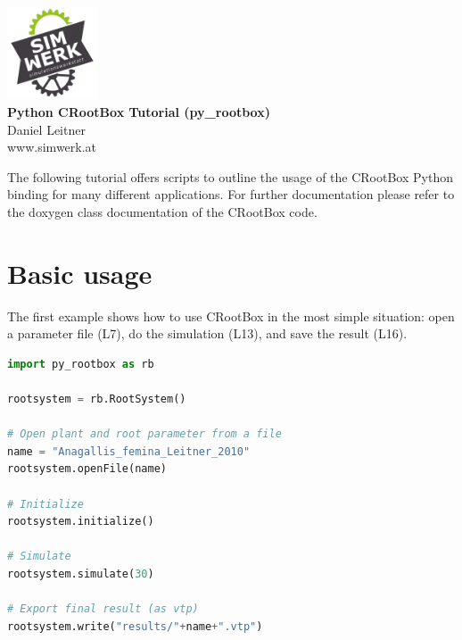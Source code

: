 \documentclass[a4paper]{article}
\begin{document}
\begin{center}
\includegraphics[width=0.2\textwidth]{sw_logo} \\
\vspace{0.5 cm}
\huge{\textbf{Python CRootBox Tutorial (py\_rootbox)}} \\
\vspace{0.5 cm}
\normalsize
Daniel Leitner \\
www.simwerk.at 
\end{center}

\vspace{0.5 cm}

\noindent 
The following tutorial offers scripts to outline the usage of the CRootBox Python binding for many different applications. 
For further documentation please refer to the doxygen class documentation of the CRootBox code.



\section{Basic usage}
 
The first example shows how to use CRootBox in the most simple situation: open a parameter file (L7), do the simulation (L13), and save the result (L16). 

\begin{lstlisting}[language=Python, caption=Example 1a]
import py_rootbox as rb

rootsystem = rb.RootSystem()

# Open plant and root parameter from a file
name = "Anagallis_femina_Leitner_2010" 
rootsystem.openFile(name) 

# Initialize
rootsystem.initialize() 

# Simulate
rootsystem.simulate(30) 

# Export final result (as vtp)
rootsystem.write("results/"+name+".vtp") 
\end{lstlisting}
\end{document}
